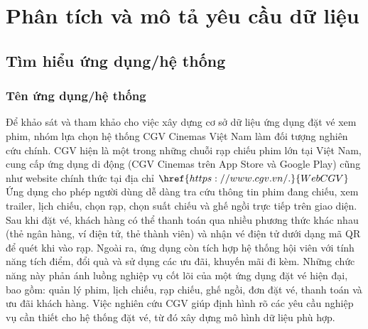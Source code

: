 \documentclass[a4paper]{article}
\newcommand{\cach}{\hspace*{1.5em}\ignorespaces}
\begin{document}
\pagebreak
\section{Phân tích và mô tả yêu cầu dữ liệu}
\subsection{Tìm hiểu ứng dụng/hệ thống}
\subsubsection{Tên ứng dụng/hệ thống}
\cach Để khảo sát và tham khảo cho việc xây dựng cơ sở dữ liệu ứng dụng đặt vé xem phim, nhóm lựa chọn hệ thống CGV Cinemas Việt Nam làm đối tượng nghiên cứu chính. CGV hiện là một trong những chuỗi rạp chiếu phim lớn tại Việt Nam, cung cấp ứng dụng di động (CGV Cinemas trên App Store và Google Play) cũng như website chính thức tại địa chỉ $\href{https://www.cgv.vn/.}{WebCGV}$ Ứng dụng cho phép người dùng dễ dàng tra cứu thông tin phim đang chiếu, xem trailer, lịch chiếu, chọn rạp, chọn suất chiếu và ghế ngồi trực tiếp trên giao diện. Sau khi đặt vé, khách hàng có thể thanh toán qua nhiều phương thức khác nhau (thẻ ngân hàng, ví điện tử, thẻ thành viên) và nhận vé điện tử dưới dạng mã QR để quét khi vào rạp. Ngoài ra, ứng dụng còn tích hợp hệ thống hội viên với tính năng tích điểm, đổi quà và sử dụng các ưu đãi, khuyến mãi đi kèm. Những chức năng này phản ánh luồng nghiệp vụ cốt lõi của một ứng dụng đặt vé hiện đại, bao gồm: quản lý phim, lịch chiếu, rạp chiếu, ghế ngồi, đơn đặt vé, thanh toán và ưu đãi khách hàng. Việc nghiên cứu CGV giúp định hình rõ các yêu cầu nghiệp vụ cần thiết cho hệ thống đặt vé, từ đó xây dựng mô hình dữ liệu phù hợp.
\end{document}
